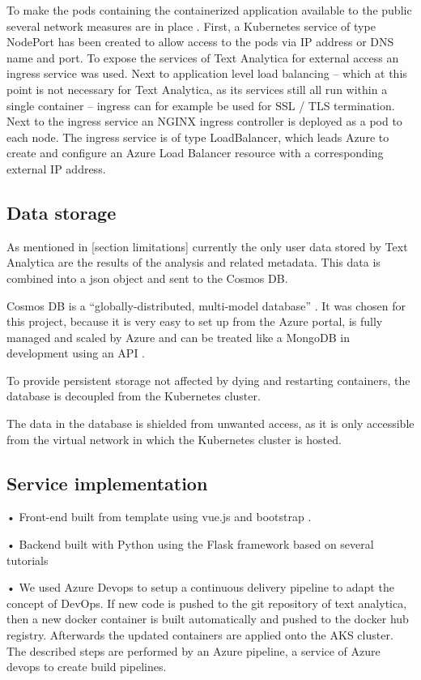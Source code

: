 \documentclass[conference]{IEEEtran}
\begin{document}
To make the pods containing the containerized application available to the public several network measures are in place \cite{AKSNetworks} \cite{AzureExposeKubernetesCluster}. First, a Kubernetes service of type NodePort has been created to allow access to the pods via IP address or DNS name and port. To expose the services of Text Analytica for external access an ingress service was used. Next to application level load balancing – which at this point is not necessary for Text Analytica, as its services still all run within a single container – ingress can for example be used for SSL / TLS termination. Next to the ingress service an NGINX ingress controller is deployed as a pod to each node. The ingress service is of type LoadBalancer, which leads Azure to create and configure an Azure Load Balancer resource with a corresponding external IP address.

\subsection{Data storage}
As mentioned in [section limitations] currently the only user data stored by Text Analytica are the results of the analysis and related metadata. This data is combined into a json object and sent to the Cosmos DB.

Cosmos DB is a “globally-distributed, multi-model database” \cite{CosmosDB}. It was chosen for this project, because it is very easy to set up from the Azure portal, is fully managed and scaled by Azure and can be treated like a MongoDB in development using an API \cite{CosmosMongoDB}.

To provide persistent storage not affected by dying and restarting containers, the database is decoupled from the Kubernetes cluster.

The data in the database is shielded from unwanted access, as it is only accessible from the virtual network in which the Kubernetes cluster is hosted.

\subsection{Service implementation}
•	Front-end built from template using vue.js and bootstrap \cite{Bootstrap}.

•	Backend built with Python using the Flask framework based on several tutorials

•	We used Azure Devops to setup a continuous delivery pipeline to adapt the concept of DevOps. If new code is pushed to the git repository of text analytica, then a new docker container is built automatically and pushed to the docker hub registry. Afterwards the updated containers are applied onto the AKS cluster. The described steps are performed by an Azure pipeline, a service of Azure devops to create build pipelines.
\end{document}
